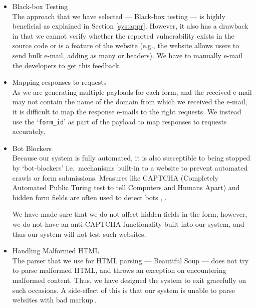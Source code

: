 \begin{itemize}
	\item Black-box Testing\\
	The approach that we have selected --- Black-box testing --- is highly beneficial as explained in Section \ref{sys:appr}. However, it also has a drawback in that we cannot verify whether the reported vulnerability exists in the source code or is a feature of the website (e.g., the website allows users to send bulk e-mail, adding as many  or  headers). We have to manually e-mail the developers to get this feedback.
	
	\item Mapping responses to requests\\
	As we are generating multiple payloads for each form, and the received e-mail may not contain the name of the domain from which we received the e-mail, it is difficult to map the response e-mails to the right requests. We instead use the `\lstinline{form_id}' as part of the payload to map responses to requests accurately.
	
	\item Bot Blockers\\
	\label{issues:captcha}
    Because our system is fully automated, it is also susceptible to being stopped by `bot-blockers' i.e.\ mechanisms built-in to a website to prevent automated crawls or form submissions. Measures like CAPTCHA (Completely Automated Public Turing test to tell Computers and Humans Apart) and hidden form fields are often used to detect bots \cite{captchas3}, \cite{captchas2}.
    
    We have made sure that we do not affect hidden fields in the form, however, we do not have an anti-CAPTCHA functionality built into our system, and thus our system will not test such websites.
    
	\item Handling Malformed HTML\\
    The parser that we use for HTML parsing --- Beautiful Soup --- does not try to parse malformed HTML, and throws an exception on encountering malformed content. Thus, we have designed the system to exit gracefully on such occasions. A side-effect of this is that our system is unable to parse websites with bad markup\,\footnotemark.
    
	

\end{itemize}
